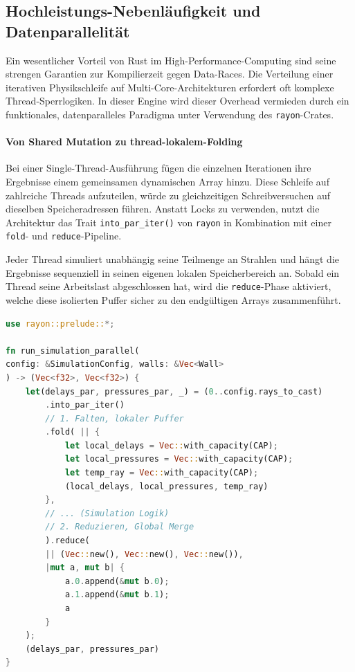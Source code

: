 \subsection{Hochleistungs-Nebenläufigkeit und Datenparallelität}
\label{subsec:concurrency}

Ein wesentlicher Vorteil von Rust im High-Performance-Computing sind seine strengen Garantien zur Kompilierzeit gegen Data-Races. Die Verteilung einer iterativen Physikschleife auf Multi-Core-Architekturen erfordert oft komplexe Thread-Sperrlogiken. In dieser Engine wird dieser Overhead vermieden durch ein funktionales, datenparalleles Paradigma unter Verwendung des \texttt{rayon}-Crates.

\paragraph{Von Shared Mutation zu thread-lokalem-Folding}
Bei einer Single-Thread-Ausführung fügen die einzelnen Iterationen ihre Ergebnisse einem gemeinsamen dynamischen Array hinzu.
Diese Schleife auf zahlreiche Threads aufzuteilen, würde zu gleichzeitigen Schreibversuchen auf dieselben Speicheradressen führen.
Anstatt Locks zu verwenden, nutzt die Architektur das Trait \texttt{into\_par\_iter()} von \texttt{rayon} in Kombination mit einer \texttt{fold}- und \texttt{reduce}-Pipeline.

Jeder Thread simuliert unabhängig seine Teilmenge an Strahlen und hängt die Ergebnisse sequenziell in seinen eigenen lokalen Speicherbereich an.
Sobald ein Thread seine Arbeitslast abgeschlossen hat, wird die \texttt{reduce}-Phase aktiviert, welche diese isolierten Puffer sicher zu den endgültigen Arrays zusammenführt.

\begin{lstlisting}[language=Rust]
use rayon::prelude::*;

fn run_simulation_parallel(
config: &SimulationConfig, walls: &Vec<Wall>
) -> (Vec<f32>, Vec<f32>) {
    let(delays_par, pressures_par, _) = (0..config.rays_to_cast)
        .into_par_iter()
        // 1. Falten, lokaler Puffer
        .fold( || {
            let local_delays = Vec::with_capacity(CAP);
            let local_pressures = Vec::with_capacity(CAP);
            let temp_ray = Vec::with_capacity(CAP);
            (local_delays, local_pressures, temp_ray)
        },
        // ... (Simulation Logik)
        // 2. Reduzieren, Global Merge
        ).reduce(
        || (Vec::new(), Vec::new(), Vec::new()),
        |mut a, mut b| {
            a.0.append(&mut b.0);
            a.1.append(&mut b.1);
            a
        }
    );
    (delays_par, pressures_par)
}
\end{lstlisting}

